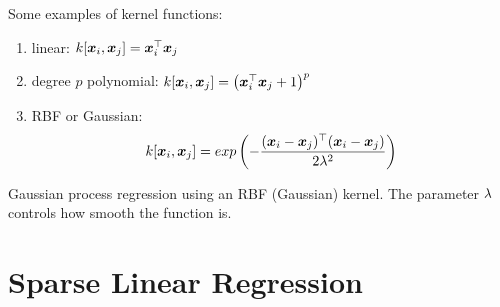 Some examples of kernel functions:
\begin{enumerate}
	\item linear: $k[\boldsymbol{x}_i,\boldsymbol{x}_j]=\boldsymbol{x}_i^\top\boldsymbol{x}_j$
	\item degree $p$ polynomial: $k[\boldsymbol{x}_i,\boldsymbol{x}_j]=\left(\boldsymbol{x}_i^\top\boldsymbol{x}_j+1\right)^p$
	\item RBF or Gaussian:
	\begin{align*}
		k[\boldsymbol{x}_i,\boldsymbol{x}_j]=exp\left(-\frac{(\boldsymbol{x}_i-\boldsymbol{x}_j){}^\top(\boldsymbol{x}_i-\boldsymbol{x}_j)}{2\lambda^2}\right)
	\end{align*}
\end{enumerate}
Gaussian process regression using an RBF (Gaussian) kernel. The parameter $\lambda$ controls how smooth the function is.



\section{Sparse Linear Regression}
\label{section6.6}

